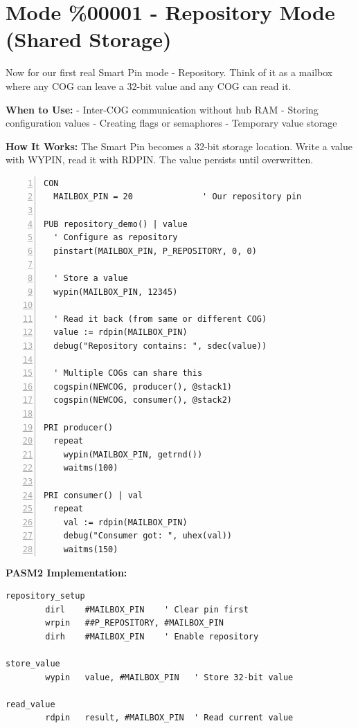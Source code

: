 \documentclass[11pt,a4paper,oneside,english]{book}
\begin{document}
\clearpage

\hypertarget{mode-00001---repository-mode-shared-storage}{%
\section{Mode \%00001 - Repository Mode (Shared
Storage)}\label{mode-00001---repository-mode-shared-storage}}

Now for our first real Smart Pin mode - Repository. Think of it as a
mailbox where any COG can leave a 32-bit value and any COG can read it.

\textbf{When to Use:} - Inter-COG communication without hub RAM -
Storing configuration values - Creating flags or semaphores - Temporary
value storage

\textbf{How It Works:} The Smart Pin becomes a 32-bit storage location.
Write a value with WYPIN, read it with RDPIN. The value persists until
overwritten.

\begin{Spin2Block}
\begin{Verbatim}[numbers=left,numbersep=5pt,xleftmargin=15pt]
CON
  MAILBOX_PIN = 20              ' Our repository pin

PUB repository_demo() | value
  ' Configure as repository
  pinstart(MAILBOX_PIN, P_REPOSITORY, 0, 0)
  
  ' Store a value
  wypin(MAILBOX_PIN, 12345)
  
  ' Read it back (from same or different COG)
  value := rdpin(MAILBOX_PIN)
  debug("Repository contains: ", sdec(value))
  
  ' Multiple COGs can share this
  cogspin(NEWCOG, producer(), @stack1)
  cogspin(NEWCOG, consumer(), @stack2)

PRI producer()
  repeat
    wypin(MAILBOX_PIN, getrnd())
    waitms(100)

PRI consumer() | val
  repeat
    val := rdpin(MAILBOX_PIN)
    debug("Consumer got: ", uhex(val))
    waitms(150)
\end{Verbatim}
\end{Spin2Block}

\textbf{PASM2 Implementation:}

\begin{PASM2Block}
\begin{lstlisting}
repository_setup
        dirl    #MAILBOX_PIN    ' Clear pin first
        wrpin   ##P_REPOSITORY, #MAILBOX_PIN
        dirh    #MAILBOX_PIN    ' Enable repository
        
store_value
        wypin   value, #MAILBOX_PIN   ' Store 32-bit value
        
read_value
        rdpin   result, #MAILBOX_PIN  ' Read current value
\end{lstlisting}
\end{PASM2Block}
\end{document}

